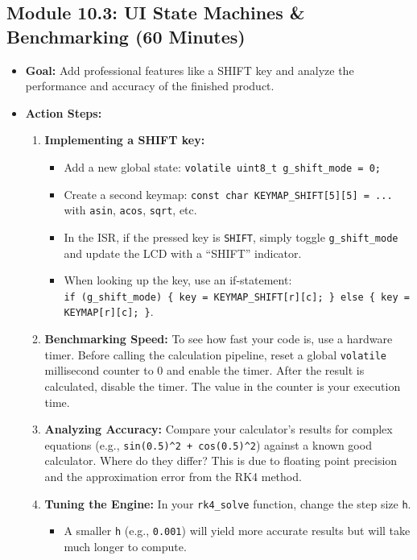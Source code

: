 \documentclass[11pt,a4paper]{article}
\begin{document}
\subsection*{Module 10.3: UI State Machines \& Benchmarking (60 Minutes)}

\begin{itemize}
    \item \textbf{Goal:} Add professional features like a SHIFT key and analyze the performance and accuracy of the finished product.
    \item \textbf{Action Steps:}
    \begin{enumerate}
        \item \textbf{Implementing a SHIFT key:}
        \begin{itemize}
            \item Add a new global state: \verb|volatile uint8_t g_shift_mode = 0;|
            \item Create a second keymap: \verb|const char KEYMAP_SHIFT[5][5] = ...| with \verb|asin|, \verb|acos|, \verb|sqrt|, etc.
            \item In the ISR, if the pressed key is \verb|SHIFT|, simply toggle \verb|g_shift_mode| and update the LCD with a ``SHIFT'' indicator.
            \item When looking up the key, use an if-statement:\\ \verb|if (g_shift_mode) { key = KEYMAP_SHIFT[r][c]; } else { key = KEYMAP[r][c]; }|.
        \end{itemize}
        \item \textbf{Benchmarking Speed:} To see how fast your code is, use a hardware timer. Before calling the calculation pipeline, reset a global \verb|volatile| millisecond counter to 0 and enable the timer. After the result is calculated, disable the timer. The value in the counter is your execution time.
        \item \textbf{Analyzing Accuracy:} Compare your calculator's results for complex equations (e.g., \verb|sin(0.5)^2 + cos(0.5)^2|) against a known good calculator. Where do they differ? This is due to floating point precision and the approximation error from the RK4 method.
        \item \textbf{Tuning the Engine:} In your \verb|rk4_solve| function, change the step size \verb|h|.
        \begin{itemize}
            \item A smaller \verb|h| (e.g., \verb|0.001|) will yield more accurate results but will take much longer to compute.

\end{itemize}
\end{enumerate}
\end{itemize}
\end{document}
